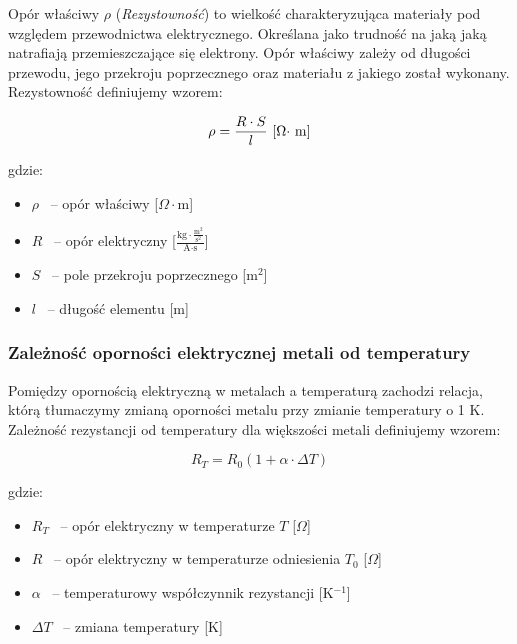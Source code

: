 \documentclass[a4paper,12pts]{article}
\begin{document}
	Opór właściwy $\rho$ (\textit{Rezystowność}) to wielkość charakteryzująca materiały pod względem przewodnictwa elektrycznego. Określana jako trudność na jaką jaką natrafiają przemieszczające się elektrony. Opór właściwy zależy od długości przewodu, jego przekroju poprzecznego oraz materiału z jakiego został wykonany. Rezystowność definiujemy wzorem:
	
	\begin{equation}
		\rho = \frac{R \cdot S}{l} \textrm{  [$\Omega \cdot$ \textrm{m}]}
	\end{equation}

	gdzie: 
	\begin{itemize}
		\item $\rho$ ~-- opór właściwy [$\Omega \cdot \textrm{m}$]
		\item $R$ ~-- opór elektryczny [$\frac{\textrm{kg} \cdot \frac{\textrm{m}^{2}}{\textrm{s}^{2}}}{\textrm{A} \cdot \textrm{s}}$]
		\item $S$ ~-- pole przekroju poprzecznego [\textrm{m}$^{2}$]
		\item $l$ ~-- długość elementu [m]
	\end{itemize}


	\subsubsection{Zależność oporności elektrycznej metali od temperatury}
	
	Pomiędzy opornością elektryczną w metalach a temperaturą zachodzi relacja, którą tłumaczymy zmianą oporności metalu przy zmianie temperatury o 1 K. Zależność rezystancji od temperatury dla większości metali definiujemy wzorem:
	
	\begin{equation}
		R_{T} = R_{0}(1 + \alpha \cdot \Delta T)
	\end{equation}
	
	gdzie:
	\begin{itemize}
	\item $R_{T}$ ~-- opór elektryczny w temperaturze $T$ [$\Omega$]
	\item $R$ ~-- opór elektryczny w temperaturze odniesienia $T_{0}$ [$\Omega$]
	\item $\alpha$ ~-- temperaturowy współczynnik rezystancji [K$^{-1}$]
	\item $\Delta T$ ~-- zmiana temperatury [K]
\end{itemize}
	
\end{document}
